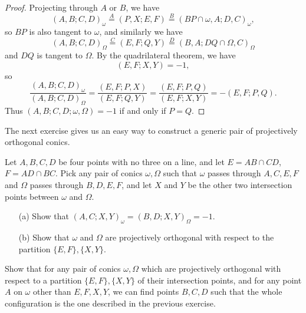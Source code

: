 \begin{proof}
Projecting through $A$ or $B$, we have
\[
(A,B;C,D)_\omega \stackrel{A}{=} (P,X;E,F) \stackrel{B}{=} (BP\cap\omega,A;D,C)_\omega,
\]
so $BP$ is also tangent to $\omega$, and similarly we have
\[
(A,B;C,D)_\Omega \stackrel{C}{=} (E,F;Q,Y) \stackrel{D}{=} (B,A;DQ\cap\Omega,C)_\Omega
\]
and $DQ$ is tangent to $\Omega$. By the quadrilateral theorem, we have
\[
(E,F;X,Y) = -1,
\]
so
\[
\frac{(A,B;C,D)_\omega}{(A,B;C,D)_\Omega} = \frac{(E,F;P,X)}{(E,F;Q,Y)} = \frac{(E,F;P,Q)}{(E,F;X,Y)} = -(E,F;P,Q).
\]
Thus $(A,B;C,D;\omega,\Omega) = -1$ if and only if $P = Q$.
\end{proof}

The next exercise gives us an easy way to construct a generic pair of projectively orthogonal conics.

\begin{exer} Let $A,B,C,D$ be four points with no three on a line, and let $E = AB \cap CD$, $F = AD \cap BC$. Pick any pair of conics $\omega, \Omega$ such that $\omega$ passes through $A,C,E,F$ and $\Omega$ passes through $B,D,E,F$, and let $X$ and $Y$ be the other two intersection points between $\omega$ and $\Omega$.
\begin{itemize}
\item[(a)] Show that $(A,C;X,Y)_\omega = (B,D;X,Y)_\Omega = -1$.

\item[(b)] Show that $\omega$ and $\Omega$ are projectively orthogonal with respect to the partition $\{E,F\}, \{X,Y\}$.
\end{itemize}
\end{exer}

\begin{exer} Show that for any pair of conics $\omega, \Omega$ which are projectively orthogonal with respect to a partition $\{E,F\}, \{X,Y\}$ of their intersection points, and for any point $A$ on $\omega$ other than $E,F,X,Y$, we can find points $B,C,D$ such that the whole configuration is the one described in the previous exercise.
\end{exer}

